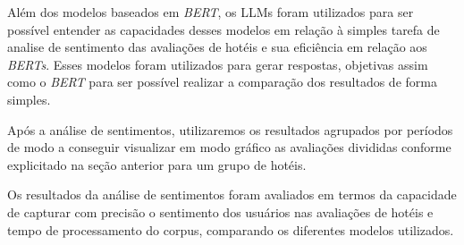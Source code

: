 Além dos modelos baseados em \textit{BERT}, os LLMs foram utilizados para ser possível entender as capacidades desses modelos em relação à simples tarefa de analise de sentimento das avaliações de hotéis e sua eficiência em relação aos \textit{BERTs}. Esses modelos foram utilizados para gerar respostas, objetivas assim como o \textit{BERT} para ser possível realizar a comparação dos resultados de forma simples.

Após a análise de sentimentos, utilizaremos os resultados agrupados por períodos de modo a conseguir visualizar em modo gráfico as avaliações divididas conforme explicitado na seção anterior para um grupo de hotéis.

Os resultados da análise de sentimentos foram avaliados em termos da capacidade de capturar com precisão o sentimento dos usuários nas avaliações de hotéis e tempo de processamento do corpus, comparando os diferentes modelos utilizados.
